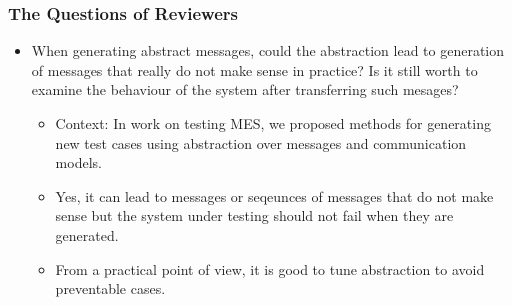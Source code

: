 \documentclass{beamer}
\newcommand{\hlgr}[1]{\textcolor{olive!50!green}{#1}}
\begin{document}
\begin{frame}[noframenumbering]
	\frametitle{The Questions of Reviewers}
	\begin{itemize}
	  \item \hlgr{When generating abstract messages, could the abstraction lead to generation of messages that really do not make sense in practice? Is it still worth to examine the behaviour of the system after transferring such mesages?}
	  \begin{itemize}
            \item Context: In work on testing MES, we proposed methods for generating new test cases using abstraction over messages and communication models.
            \item Yes, it can lead to messages or seqeunces of messages that do not make sense but the system under testing should not fail when they are generated.
            \item From a practical point of view, it is good to tune abstraction to avoid preventable cases.
	  \end{itemize}
	\end{itemize}
\end{frame}
\end{document}
